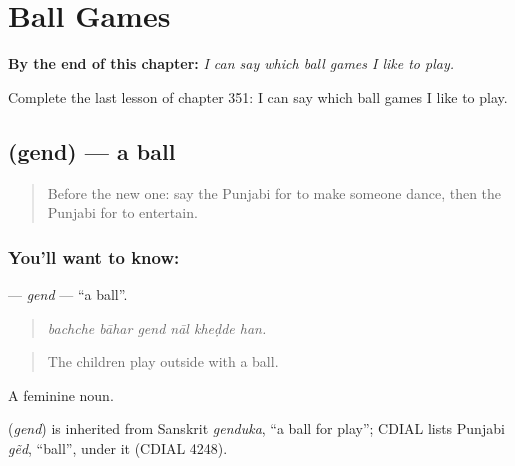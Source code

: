 
\chapter{Ball Games}
\label{ch:pa-a2-ball-games}

\begin{chapteropening}
\textbf{By the end of this chapter:} \emph{I can say which ball games I like to play.}

Complete the last lesson of chapter 351: I can say which ball games I like to play.
\end{chapteropening}

\section[\texorpdfstring{\pa{ਗੇਂਦ} (gend)}{ਗੇਂਦ (gend)}]{ (gend) — a ball}

\label{lesson:PA-C351-gend}



\begin{quote}
Before the new one: say the Punjabi for to make someone dance, then the Punjabi for to entertain.
\end{quote}

\subsection*{You'll want to know: }
\textbf{} — \emph{gend} — \textquotedblleft{}a ball\textquotedblright{}.

\begin{quote}
     
\end{quote}

\begin{quote}
\emph{bachche bāhar gend nāl kheḍde han.}
\end{quote}

\begin{quote}
The children play outside with a ball.
\end{quote}

A feminine noun.

\begin{cousinweb}
\textbf{} (\emph{gend}) is inherited from Sanskrit \emph{genduka}, \textquotedblleft{}a ball for play\textquotedblright{}; CDIAL lists Punjabi \emph{gẽd}, \textquotedblleft{}ball\textquotedblright{}, under it (CDIAL 4248).
\end{cousinweb}

